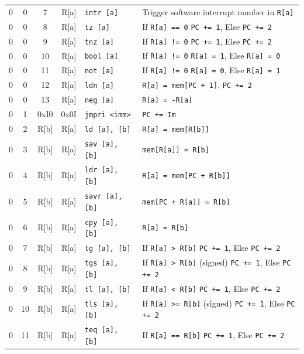 \documentclass{article}
\begin{document}
\begin{table}[h!]
\begin{footnotesize}
\begin{tabular}{cccc|l|l}
            0 & 0 & 7 & R[a] & \texttt{intr [a]} & Trigger software interrupt number in \texttt{R[a]} \\
            0 & 0 & 8 & R[a] & \texttt{tz [a]} & If \texttt{R[a] == 0} \texttt{PC += 1}, Else \texttt{PC += 2} \\
            0 & 0 & 9 & R[a] & \texttt{tnz [a]} & If \texttt{R[a] != 0} \texttt{PC += 1}, Else \texttt{PC += 2} \\
            0 & 0 & 10 & R[a] & \texttt{bool [a]} & If \texttt{R[a] != 0} \texttt{R[a] = 1}, Else \texttt{R[a] = 0} \\
            0 & 0 & 11 & R[a] & \texttt{not [a]} & If \texttt{R[a] != 0} \texttt{R[a] = 0}, Else \texttt{R[a] = 1} \\
            0 & 0 & 12 & R[a] & \texttt{ldn [a]} & \texttt{R[a] = mem[PC + 1]}, \texttt{PC += 2} \\
            0 & 0 & 13 & R[a] & \texttt{neg [a]} & \texttt{R[a] = -R[a]} \\
            0 & 1 & 0xI0 & 0x0I & \texttt{jmpri <imm>} & \texttt{PC += Im} \\
            0 & 2 & R[b] & R[a] & \texttt{ld [a], [b]} & \texttt{R[a] = mem[R[b]]} \\
            0 & 3 & R[b] & R[a] & \texttt{sav [a], [b]} & \texttt{mem[R[a]] = R[b]} \\
            0 & 4 & R[b] & R[a] & \texttt{ldr [a], [b]} & \texttt{R[a] = mem[PC + R[b]]} \\
            0 & 5 & R[b] & R[a] & \texttt{savr [a], [b]} & \texttt{mem[PC + R[a]] = R[b]} \\
            0 & 6 & R[b] & R[a] & \texttt{cpy [a], [b]} & \texttt{R[a] = R[b]} \\
            0 & 7 & R[b] & R[a] & \texttt{tg [a], [b]} & If \texttt{R[a] > R[b]} \texttt{PC += 1}, Else \texttt{PC += 2} \\
            0 & 8 & R[b] & R[a] & \texttt{tgs [a], [b]} & If \texttt{R[a] > R[b]} (signed) \texttt{PC += 1}, Else \texttt{PC += 2} \\
            0 & 9 & R[b] & R[a] & \texttt{tl [a], [b]} & If \texttt{R[a] < R[b]} \texttt{PC += 1}, Else \texttt{PC += 2} \\
            0 & 10 & R[b] & R[a] & \texttt{tls [a], [b]} & If \texttt{R[a] >= R[b]} (signed) \texttt{PC += 1}, Else \texttt{PC += 2} \\
            0 & 11 & R[b] & R[a] & \texttt{teq [a], [b]} & If \texttt{R[a] == R[b]} \texttt{PC += 1}, Else \texttt{PC += 2} \\

\end{tabular}
\end{footnotesize}
\end{table}
\end{document}
